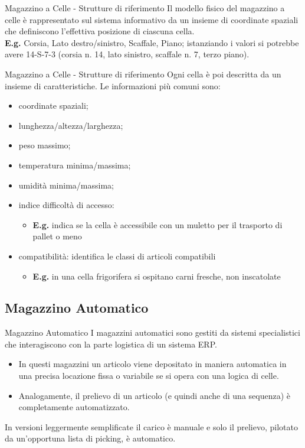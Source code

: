 \documentclass{beamer}
\begin{document}
\begin{frame}{Magazzino a Celle - Strutture di riferimento}
    Il modello fisico del magazzino a celle è rappresentato sul sistema informativo da un insieme di coordinate spaziali che definiscono l’effettiva posizione di ciascuna cella.\\
    \vspace{1.5em}
    \textbf{E.g.} Corsia, Lato destro/sinistro, Scaffale, Piano; istanziando i valori si potrebbe avere 14-S-7-3 (corsia n. 14, lato sinistro, scaffale n. 7, terzo piano).
    \vspace{1.5em}
\end{frame}

\begin{frame}{Magazzino a Celle - Strutture di riferimento}
    Ogni cella è poi descritta da un insieme di caratteristiche. Le informazioni più comuni sono:
    \begin{itemize}
        \item coordinate spaziali;
        \item lunghezza/altezza/larghezza;
        \item peso massimo;
        \item temperatura minima/massima;
        \item umidità minima/massima;
        \item indice difficoltà di accesso:
        \begin{itemize}
            \item \textbf{E.g.} indica se la cella è accessibile con un muletto per il trasporto di pallet o meno
        \end{itemize}
        \item compatibilità: identifica le classi di articoli compatibili
        \begin{itemize}
            \item \textbf{E.g.} in una cella frigorifera si ospitano carni fresche, non inscatolate
        \end{itemize}
    \end{itemize}
\end{frame}

\subsection{Magazzino Automatico}
\begin{frame}{Magazzino Automatico}
    I magazzini automatici sono gestiti da sistemi specialistici che interagiscono con la parte logistica di un sistema ERP.\\
    \begin{itemize}
        \item In questi magazzini un articolo viene depositato in maniera automatica in una precisa locazione fissa o variabile se si opera con una logica di celle.
        \item Analogamente, il prelievo di un articolo (e quindi anche di una sequenza) è completamente automatizzato.
    \end{itemize}
    In versioni leggermente semplificate il carico è manuale e solo il prelievo, pilotato da un’opportuna lista di picking, è automatico.
\end{frame}
\end{document}
